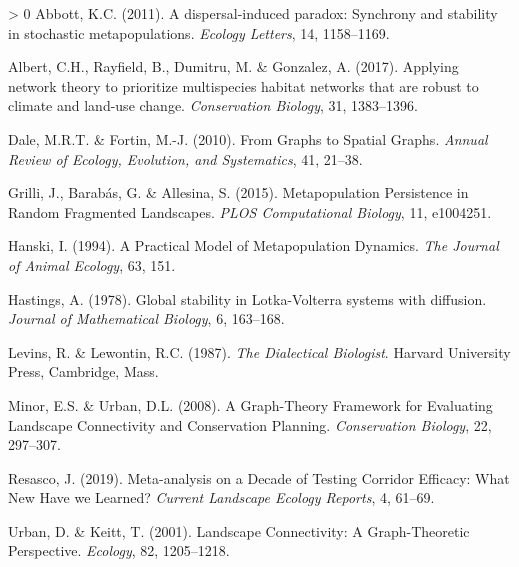 \documentclass[10pt,oneside]{article}
\newlength{\cslhangindent}
\newenvironment{CSLReferences}[3] %
 {%
  \setlength{\parindent}{0pt}
  \ifodd #1 \everypar{\setlength{\hangindent}{\cslhangindent}}\ignorespaces\fi
  \ifnum #2 > 0
  \setlength{\parskip}{#2\baselineskip}
  \fi
 }%
 {}
\begin{document}
\hypertarget{refs}{}
\begin{CSLReferences}{1}{0}
\leavevmode\hypertarget{ref-Abbott2011DisPar}{}%
Abbott, K.C. (2011). A dispersal-induced paradox: Synchrony and
stability in stochastic metapopulations. \emph{Ecology Letters}, 14,
1158--1169.

\leavevmode\hypertarget{ref-Albert2017AppNet}{}%
Albert, C.H., Rayfield, B., Dumitru, M. \& Gonzalez, A. (2017). Applying
network theory to prioritize multispecies habitat networks that are
robust to climate and land-use change. \emph{Conservation Biology}, 31,
1383--1396.

\leavevmode\hypertarget{ref-Dale2010GraSpa}{}%
Dale, M.R.T. \& Fortin, M.-J. (2010). From Graphs to Spatial Graphs.
\emph{Annual Review of Ecology, Evolution, and Systematics}, 41, 21--38.

\leavevmode\hypertarget{ref-Grilli2015MetPer}{}%
Grilli, J., Barabás, G. \& Allesina, S. (2015). Metapopulation
Persistence in Random Fragmented Landscapes. \emph{PLOS Computational
Biology}, 11, e1004251.

\leavevmode\hypertarget{ref-Hanski1994PraMod}{}%
Hanski, I. (1994). A Practical Model of Metapopulation Dynamics.
\emph{The Journal of Animal Ecology}, 63, 151.

\leavevmode\hypertarget{ref-Hastings1978GloSta}{}%
Hastings, A. (1978). Global stability in Lotka-Volterra systems with
diffusion. \emph{Journal of Mathematical Biology}, 6, 163--168.

\leavevmode\hypertarget{ref-Levins1987DiaBio}{}%
Levins, R. \& Lewontin, R.C. (1987). \emph{The Dialectical Biologist}.
Harvard University Press, Cambridge, Mass.

\leavevmode\hypertarget{ref-Minor2008GraFra}{}%
Minor, E.S. \& Urban, D.L. (2008). A Graph-Theory Framework for
Evaluating Landscape Connectivity and Conservation Planning.
\emph{Conservation Biology}, 22, 297--307.

\leavevmode\hypertarget{ref-Resasco2019MetDec}{}%
Resasco, J. (2019). Meta-analysis on a Decade of Testing Corridor
Efficacy: What New Have we Learned? \emph{Current Landscape Ecology
Reports}, 4, 61--69.

\leavevmode\hypertarget{ref-Urban2001LanCon}{}%
Urban, D. \& Keitt, T. (2001). Landscape Connectivity: A Graph-Theoretic
Perspective. \emph{Ecology}, 82, 1205--1218.

\end{CSLReferences}
\end{document}

